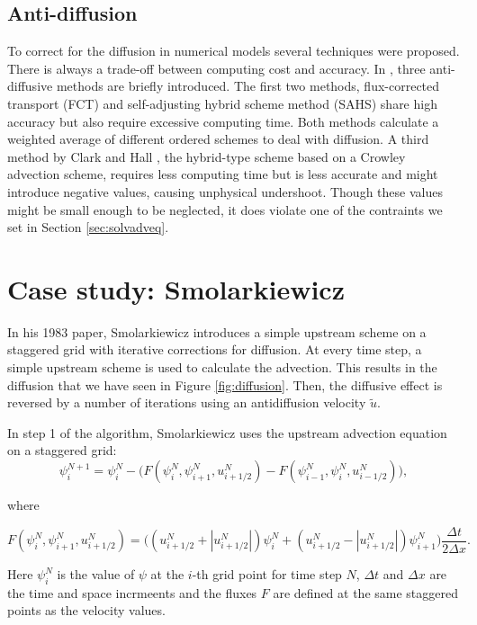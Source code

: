 \documentclass[10pt, a4paper]{article}
\newcommand{\abs}[1]{\left\lvert#1\right\rvert}
\begin{document}
\subsection{Anti-diffusion}
To correct for the diffusion in numerical models several techniques were proposed. There is always a trade-off between computing cost and accuracy. In \cite{smolarki}, three anti-diffusive methods are briefly introduced. The first two methods, flux-corrected transport (FCT) \cite{borisbook} and self-adjusting hybrid scheme method (SAHS) \cite{hartenzwas} share high accuracy but also require excessive computing time. Both methods calculate a weighted average of different ordered schemes to deal with diffusion. A third method by Clark and Hall \cite{clarkhall}, the hybrid-type scheme based on a Crowley advection scheme, requires less computing time but is less accurate and might introduce negative values, causing unphysical undershoot. Though these values might be small enough to be neglected, it does violate one of the contraints we set in Section \ref{sec:solvadveq}.

\section{Case study: Smolarkiewicz}
In his 1983 paper, Smolarkiewicz introduces a simple upstream scheme on a staggered grid with iterative corrections for diffusion. At every time step, a simple upstream scheme is used to calculate the advection. This results in the diffusion that we have seen in Figure \ref{fig:diffusion}. Then, the diffusive effect is reversed by a number of iterations using an antidiffusion velocity $\tilde{u}$.

In step 1 of the algorithm, Smolarkiewicz uses the upstream advection equation on a staggered grid:
\begin{equation}
 \psi_i^{N+1} = \psi_i^N - \Big( F \left( \psi_i^N,\psi_{i+1}^N,u_{i+1/2}^N\right)
-F \left( \psi_{i-1}^N,\psi_{i}^N,u_{i-1/2}^N\right) \Big),\label{eq:noanti}
\end{equation}

where

\begin{equation}
F \left( \psi_i^N,\psi_{i+1}^N,u_{i+1/2}^N\right) =
\Big( \left( u_{i+1/2}^N + \abs{u_{i+1/2}^N} \right) \psi_i^N
+ \left( u_{i+1/2}^N - \abs{u_{i+1/2}^N} \right) \psi_{i+1}^N \Big)
\frac{\Delta t}{2 \Delta x}.
\end{equation}


Here $\psi_i^N$ is the value of $\psi$ at the $i$-th grid point for time step $N$, $\Delta t$ and $\Delta x$ are the time and space incrmeents and the fluxes $F$ are defined at the same staggered points as the velocity values.
\end{document}
